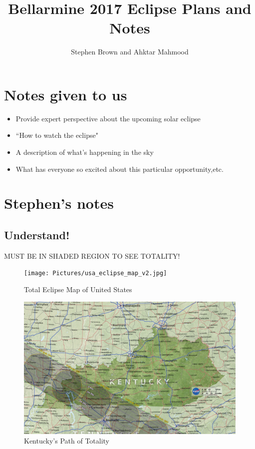 \documentclass{article}
\title{Bellarmine 2017 Eclipse Plans and Notes}
\author{Stephen Brown and Ahktar Mahmood}
\begin{document}
\maketitle


\section{Notes given to us}

\begin{itemize}
\item Provide expert perspective about the upcoming solar eclipse
\item ``How to watch the eclipse"
\item A description of what's happening in the sky
\item What has everyone so excited about this particular opportunity,etc.
\end{itemize}


\section{Stephen's notes}

\subsection{Understand!}
MUST BE IN SHADED REGION TO SEE TOTALITY!
\begin{figure}[h]
\centering
\texttt{[image: Pictures/usa\_eclipse\_map\_v2.jpg]}
\caption{Total Eclipse Map of United States}
\end{figure}

\begin{figure}[h]
\includegraphics[scale=.2]{Pictures/Ky_eclipse_path.jpg}
\caption{Kentucky's Path of Totality}
\end{figure}
\end{document}
